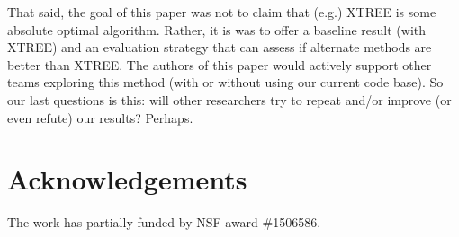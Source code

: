\documentclass{sig-alternate}
\begin{document}
That said, the goal of this paper was not to claim that (e.g.) XTREE is some absolute optimal algorithm. Rather, it is
was to offer a baseline result (with XTREE) and an  evaluation strategy that  can assess  if alternate methods are better than XTREE.
The authors of this paper would actively support other teams exploring this
method (with or without using our current code base). So our last questions is this:
will other  researchers try to repeat and/or improve
(or even refute) our results?  Perhaps.

\section*{Acknowledgements}
The work has partially funded by NSF  award \#1506586.



\balance

\end{document}
